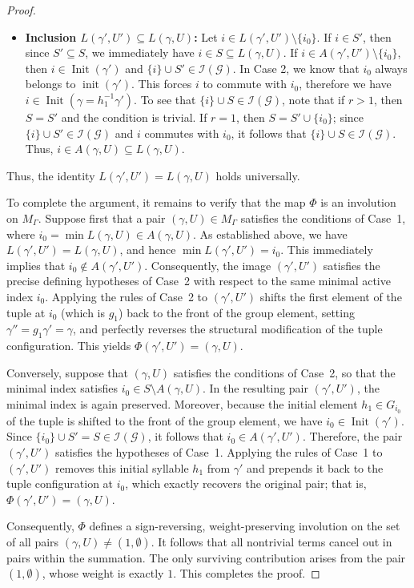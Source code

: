\documentclass[10pt,a4paper]{amsart}
\begin{document}
\begin{proof}
\begin{itemize}
    \medskip
    \item \textbf{Inclusion $L(\gamma', U') \subseteq L(\gamma, U)$:} Let $i \in L(\gamma', U') \setminus \{i_0\}$. If $i \in S'$, then since $S' \subseteq S$, we immediately have $i \in S \subseteq L(\gamma, U)$. If $i \in A(\gamma', U') \setminus \{i_0\}$, then $i \in \operatorname{Init}(\gamma')$ and $\{i\} \cup S' \in \mathcal{I}(\mathcal{G})$. In Case 2, we know that $i_0$ always belongs to $ \operatorname{init}(\gamma')$. This forces $i$ to commute with $i_0$, therefore we have  $i \in \operatorname{Init}(\gamma = h_1^{-1} \gamma')$. To see that $\{i\} \cup S \in \mathcal{I}(\mathcal{G})$, note that if $r > 1$, then $S = S'$ and the condition is trivial. If $r = 1$, then $S = S' \cup \{i_0\}$; since $\{i\} \cup S' \in \mathcal{I}(\mathcal{G})$ and $i$ commutes with $i_0$, it follows that $\{i\} \cup S \in \mathcal{I}(\mathcal{G})$. Thus, $i \in A(\gamma, U) \subseteq L(\gamma, U)$.
\end{itemize}
Thus, the identity $L(\gamma', U') = L(\gamma, U)$ holds universally.

To complete the argument, it remains to verify that the map $\Phi$ is an involution on $M_\Gamma$. Suppose first that a pair $(\gamma,U) \in M_\Gamma$ satisfies the conditions of Case~1, where $i_0 = \min L(\gamma,U) \in A(\gamma,U)$. As established above, we have  $L(\gamma', U') = L(\gamma, U)$, and hence $\min L(\gamma', U') = i_0$. This immediately implies that $i_0 \notin A(\gamma',U')$. Consequently, the image $(\gamma', U')$ satisfies the precise defining hypotheses of Case~2 with respect to the same minimal active index $i_0$. Applying the rules of Case~2 to $(\gamma', U')$ shifts the first element of the tuple at $i_0$ (which is $g_1$) back to the front of the group element, setting $\gamma'' = g_1\gamma' = \gamma$, and perfectly reverses the structural modification of the tuple configuration. This yields $\Phi(\gamma', U') = (\gamma, U)$.

Conversely, suppose that $(\gamma,U)$ satisfies the conditions of Case~2, so that the minimal index satisfies $i_0 \in S \setminus A(\gamma,U)$. In the resulting pair $(\gamma',U')$, the minimal index is again preserved. Moreover, because the initial element $h_1 \in G_{i_0}$ of the tuple is shifted to the front of the group element, we have $i_0 \in \operatorname{Init}(\gamma')$. Since $\{i_0\} \cup S' = S \in \mathcal{I}(\mathcal{G})$, it follows that $i_0 \in A(\gamma',U')$. Therefore, the pair $(\gamma',U')$ satisfies the hypotheses of Case~1. Applying the rules of Case~1 to $(\gamma',U')$ removes this initial syllable $h_1$ from $\gamma'$ and prepends it back to the tuple configuration at $i_0$, which exactly recovers the original pair; that is, $\Phi(\gamma', U') = (\gamma, U)$.

Consequently, $\Phi$ defines a sign-reversing, weight-preserving involution on the set of all pairs $(\gamma, U) \neq (1, \emptyset)$. It follows that all nontrivial terms cancel out in pairs within the summation. The only surviving contribution arises from the pair $(1, \emptyset)$, whose weight is exactly $1$. This completes the proof.
\end{proof}
\end{document}
